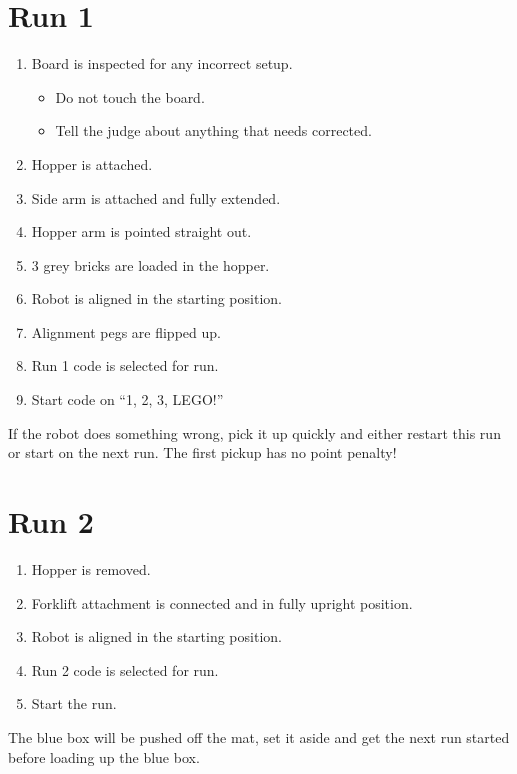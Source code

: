\documentclass[letter, article]{article}
\begin{document}
\section{Run 1}

\begin{enumerate}
    \item Board is inspected for any incorrect setup.
        \begin{itemize}
            \item Do not touch the board.
            \item Tell the judge about anything that needs corrected.
        \end{itemize}
    \item Hopper is attached.
    \item Side arm is attached and fully extended.
    \item Hopper arm is pointed straight out.
    \item 3 grey bricks are loaded in the hopper.
    \item Robot is aligned in the starting position.
    \item Alignment pegs are flipped up.
    \item Run 1 code is selected for run.
    \item Start code on ``1, 2, 3, LEGO!''
\end{enumerate}

\begin{tcolorbox}[title=Note:]
If the robot does something wrong, pick it up quickly and either restart this run or start on the next run.  The first pickup has no point penalty!
\end{tcolorbox}

\section{Run 2}

\begin{enumerate}
    \item Hopper is removed.
    \item Forklift attachment is connected and in fully upright position.
    \item Robot is aligned in the starting position.
    \item Run 2 code is selected for run.
    \item Start the run.
\end{enumerate}

\begin{tcolorbox}[title=Note:]
The blue box will be pushed off the mat, set it aside and get the next run started before loading up the blue box.
\end{tcolorbox}
\end{document}
